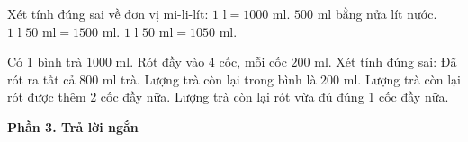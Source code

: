 \begin{ex} %
Xét tính đúng sai về đơn vị mi-li-lít:
\choiceTF
{\True $1\text{ l} = 1000\text{ ml}$.}
{\True $500\text{ ml}$ bằng nửa lít nước.}
{$1\text{ l } 50\text{ ml} = 1500\text{ ml}$.}
{\True $1\text{ l } 50\text{ ml} = 1050\text{ ml}$.}
\end{ex}

\begin{ex} %
Có 1 bình trà $1000\text{ ml}$. Rót đầy vào 4 cốc, mỗi cốc $200\text{ ml}$. Xét tính đúng sai:
\choiceTF
{\True Đã rót ra tất cả $800\text{ ml}$ trà.}
{\True Lượng trà còn lại trong bình là $200\text{ ml}$.}
{Lượng trà còn lại rót được thêm 2 cốc đầy nữa.}
{\True Lượng trà còn lại rót vừa đủ đúng 1 cốc đầy nữa.}
\end{ex}

\textbf{Phần 3. Trả lời ngắn}

